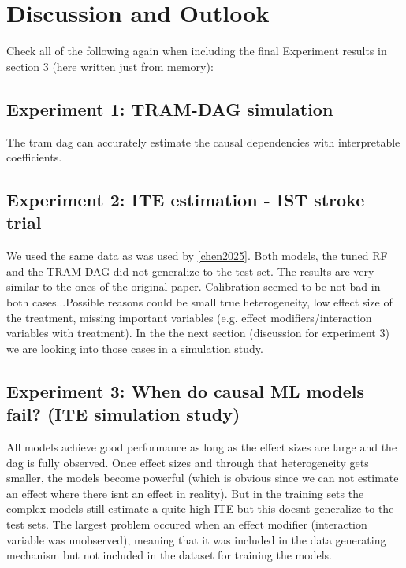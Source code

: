 

\chapter{Discussion and Outlook}


Check all of the following again when including the final Experiment results in section 3 (here written just from memory):


\section{Experiment 1: TRAM-DAG simulation}

The tram dag can accurately estimate the causal dependencies with interpretable coefficients.


\section{Experiment 2: ITE estimation - IST stroke trial}

We used the same data as was used by \ref{chen2025}. Both models, the tuned RF and the TRAM-DAG did not generalize to the test set. The results are very similar to the ones of the original paper. Calibration seemed to be not bad in both cases...Possible reasons could be small true heterogeneity, low effect size of the treatment, missing important variables (e.g. effect modifiers/interaction variables with treatment). In the the next section (discussion for experiment 3) we are looking into those cases in a simulation study.


\section{Experiment 3: When do causal ML models fail? (ITE simulation study)}

All models achieve good performance as long as the effect sizes are large and the dag is fully observed. Once effect sizes and through that heterogeneity gets smaller, the models become powerful (which is obvious since we can not estimate an effect where there isnt an effect in reality). But in the training sets the complex models still estimate a quite high ITE but this doesnt generalize to the test sets. The largest problem occured when an effect modifier (interaction variable was unobserved), meaning that it was included in the data generating mechanism but not included in the dataset for training the models. 



